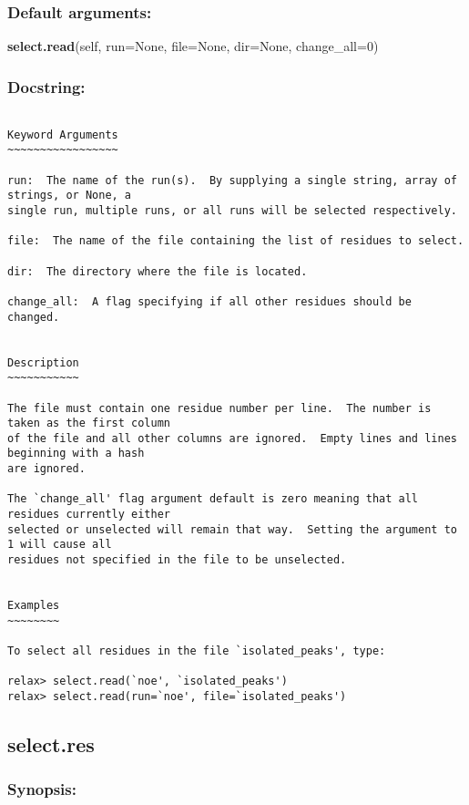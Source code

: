\subsubsection{Default arguments:}

\textsf{\textbf{select.read}(self, run=None, file=None, dir=None, change\_all=0)
}


\subsubsection{Docstring:}

{\scriptsize
\begin{verbatim}

Keyword Arguments
~~~~~~~~~~~~~~~~~

run:  The name of the run(s).  By supplying a single string, array of strings, or None, a
single run, multiple runs, or all runs will be selected respectively.

file:  The name of the file containing the list of residues to select.

dir:  The directory where the file is located.

change_all:  A flag specifying if all other residues should be changed.


Description
~~~~~~~~~~~

The file must contain one residue number per line.  The number is taken as the first column
of the file and all other columns are ignored.  Empty lines and lines beginning with a hash
are ignored.

The `change_all' flag argument default is zero meaning that all residues currently either
selected or unselected will remain that way.  Setting the argument to 1 will cause all
residues not specified in the file to be unselected.


Examples
~~~~~~~~

To select all residues in the file `isolated_peaks', type:

relax> select.read(`noe', `isolated_peaks')
relax> select.read(run=`noe', file=`isolated_peaks')
\end{verbatim}
}



\newpage

\subsection{select.res}


\subsubsection{Synopsis:}

